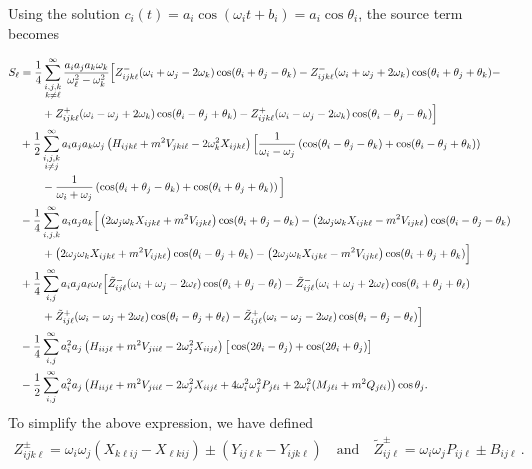 \documentclass[letterpaper,11pt]{article}
\newcommand{\oi}{\omega_i}
\newcommand{\oj}{\omega_j}
\newcommand{\ok}{\omega_k}
\newcommand{\ol}{\omega_\ell}
\newcommand{\thi}{\theta_i}
\newcommand{\thj}{\theta_j}
\newcommand{\thk}{\theta_k}
\newcommand{\thl}{\theta_\ell}
\begin{document}
Using the solution $c_i(t) = a_i \cos (\oi t + b_i) = a_i \cos \theta_i$, the source term becomes

\begin{align}
\label{general source}
S_\ell &=\frac{1}{4} \sum_{\substack{i,j,k \\ k \neq \ell}}^\infty \frac{a_i a_j a_k \ok}{\ol^2 - \ok^2} \Big[ Z^-_{ijk\ell} (\oi + \oj - 2\ok) \cos (\thi + \thj - \thk) - Z^-_{ijk\ell} (\oi + \oj + 2\ok) \cos (\thi + \thj + \thk) - \nonumber \\
%
&\qquad + Z^+_{ijk\ell} (\oi - \oj + 2\ok)  \cos(\thi - \thj + \thk) - Z^+_{ijk\ell} (\oi - \oj - 2\ok) \cos (\thi - \thj - \thk) \Big] \nonumber \\
%
& + \frac{1}{2}\sum_{\substack{i,j,k \\ i \neq j}}^\infty a_i a_j a_k \oj \left( H_{ijk\ell} + m^2 V_{jki\ell} - 2\ok^2 X_{ijk\ell} \right) \Big[ \frac{1}{\oi - \oj} \left( \cos (\thi - \thj - \thk)  + \cos(\thi - \thj + \thk) \right) \nonumber \\
%
& \qquad - \frac{1}{\oi + \oj} \left( \cos (\thi + \thj - \thk)  + \cos ( \thi + \thj + \thk) \right) \Big] \nonumber \\
%
& - \frac{1}{4} \sum_{i,j,k}^\infty a_i a_j a_k \Big[ \left( 2\oj \ok X_{ijk\ell} + m^2 V_{ijk\ell} \right)\cos(\thi + \thj - \thk) -  \left( 2\oj\ok X_{ijk\ell} - m^2 V_{ijk\ell} \right) \cos(\thi - \thj - \thk) \nonumber \\
%
& \qquad + \left(2\oj \ok X_{ijk\ell} + m^2 V_{ijk\ell} \right) \cos (\thi - \thj + \thk) - \left( 2\oj\ok X_{ijk\ell} - m^2 V_{ijk\ell} \right) \cos(\thi + \thj + \thk) \Big] \nonumber \\
%
& + \frac{1}{4} \sum_{i,j}^\infty a_i a_j a_\ell \ol \Big[ \tilde Z^-_{ij\ell} (\oi + \oj - 2\ol) \cos (\thi + \thj - \thl) - \tilde Z^-_{ij\ell} (\oi + \oj + 2\ol) \cos(\thi + \thj +  \thl) \nonumber \\
%
& \qquad + \tilde Z^+_{ij\ell} (\oi - \oj + 2\ol) \cos(\thi - \thj + \thl)  - \tilde Z^+_{ij\ell} (\oi - \oj - 2\ol) \cos( \thi - \thj - \thl)  \Big] \nonumber \\
%
& - \frac{1}{4} \sum_{i,j}^\infty a_i^2 a_j \left( H_{iij\ell} + m^2 V_{jii\ell} - 2\oj^2 X_{iij\ell} \right) \big[ \cos (2\thi - \thj) + \cos (2\thi + \thj) \big] \nonumber \\
%
& - \frac{1}{2} \sum_{i,j}^\infty a_i^2 a_j \left( H_{iij\ell} + m^2 V_{jii\ell} - 2\oj^2 X_{iij\ell} + 4\oi^2 \oj^2 P_{j\ell i} + 2\oi^2 (M_{j\ell i} + m^2 Q_{j\ell i}) \right) \cos \thj . \hspace{-0.2in}
\end{align} 
To simplify the above expression, we have defined
\begin{align}
Z^{\pm}_{ijk\ell} = \oi \oj \left( X_{k\ell ij} - X_{\ell kij} \right) \pm \left( Y_{ij\ell k} - Y_{ijk\ell} \right) \quad \text{and} \quad \tilde Z^{\pm}_{ij\ell} = \oi \oj P_{ij\ell} \pm B_{ij\ell} \, .
\end{align}
\end{document}
